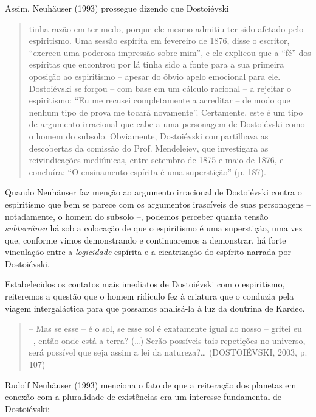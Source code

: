 Assim, Neuhäuser (1993) prossegue dizendo que Dostoiévski

\begin{quote}
tinha razão em ter medo, porque ele mesmo admitiu ter sido afetado pelo
espiritismo. Uma sessão espírita em fevereiro de 1876, disse o escritor,
``exerceu uma poderosa impressão sobre mim'', e ele explicou que a
``fé'' dos espíritas que encontrou por lá tinha sido a fonte para a sua
primeira oposição ao espiritismo -- apesar do óbvio apelo emocional para
ele. Dostoiévski se forçou -- com base em um cálculo racional -- a
rejeitar o espiritismo: ``Eu me recusei completamente a acreditar -- de
modo que nenhum tipo de prova me tocará novamente''. Certamente, este é
um tipo de argumento irracional que cabe a uma personagem de Dostoiévski
como o homem do subsolo. Obviamente, Dostoiévski compartilhava as
descobertas da comissão do Prof. Mendeleiev, que investigara as
reivindicações mediúnicas, entre setembro de 1875 e maio de 1876, e
concluíra: ``O ensinamento espírita é uma superstição'' (p. 187).
\end{quote}

Quando Neuhäuser faz menção ao argumento irracional de Dostoiévski
contra o espiritismo que bem se parece com os argumentos irascíveis de
suas personagens -- notadamente, o homem do subsolo --, podemos perceber
quanta tensão \emph{subterrânea} há sob a colocação de que o espiritismo
é uma superstição, uma vez que, conforme vimos demonstrando e
continuaremos a demonstrar, há forte vinculação entre a
\emph{logicidade} espírita e a cicatrização do espírito narrada por
Dostoiévski.

Estabelecidos os contatos mais imediatos de Dostoiévski com o
espiritismo, reiteremos a questão que o homem ridículo fez à criatura
que o conduzia pela viagem intergaláctica para que possamos analisá-la à
luz da doutrina de Kardec.

\begin{quote}
-- Mas se esse -- é o sol, se esse sol é exatamente igual ao nosso --
gritei eu --, então onde está a terra? (\ldots{}) Serão possíveis tais
repetições no universo, será possível que seja assim a lei da
natureza?\ldots{} (DOSTOIÉVSKI, 2003, p. 107)
\end{quote}

Rudolf Neuhäuser (1993) menciona o fato de que a reiteração dos planetas
em conexão com a pluralidade de existências era um interesse fundamental
de Dostoiévski:

